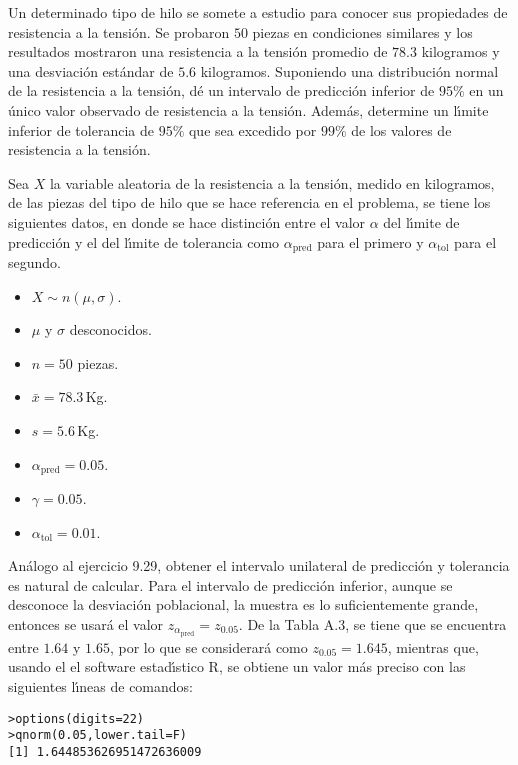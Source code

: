 \begin{enunciado}
 Un determinado tipo de hilo se somete a estudio para conocer sus propiedades de resistencia a la tensi\'on. Se probaron $50$ piezas en condiciones similares y los resultados mostraron una resistencia a la tensi\'on promedio de $78.3$ kilogramos y una desviaci\'on est\'andar de $5.6$ kilogramos. Suponiendo una distribuci\'on normal de la resistencia a la tensi\'on, d\'e un intervalo de predicci\'on inferior de $95\%$ en un \'unico valor observado de resistencia a la tensi\'on. Adem\'as, determine un l\'{\i}mite inferior de tolerancia de $95\%$ que sea excedido por $99\%$ de los valores de resistencia a la tensi\'on.
\end{enunciado}

\begin{solucion}
 Sea $X$ la variable aleatoria de la resistencia a la tensi\'on, medido en kilogramos, de las piezas del tipo de hilo que se hace referencia en el problema, se tiene los siguientes datos, en donde se hace distinci\'on entre el valor $\alpha$ del l\'{\i}mite de predicci\'on y el del l\'{\i}mite de tolerancia como $\alpha_{\text{pred}}$ para el primero y $\alpha_{\text{tol}}$ para el segundo.
 \begin{itemize}
  \item $X\sim n(\mu, \sigma)$.
  \item $\mu$ y $\sigma$ desconocidos.
  \item $n=50$ piezas.
  \item $\bar{x} = 78.3\,$Kg.
  \item $s=5.6\,$Kg.
  \item $\alpha_{\text{pred}} = 0.05$.
  \item $\gamma = 0.05$.
  \item $\alpha_{\text{tol}}=0.01$.
 \end{itemize}
 An\'alogo al ejercicio 9.29, obtener el intervalo unilateral de predicci\'on y tolerancia es natural de calcular. Para el intervalo de predicci\'on inferior, aunque se desconoce la desviaci\'on poblacional, la muestra es lo suficientemente grande, entonces se usar\'a el valor $z_{\alpha_{\text{pred}}} = z_{0.05}$. De la Tabla A.3, se tiene que se encuentra entre $1.64$ y $1.65$, por lo que se considerar\'a como $z_{0.05} = 1.645$, mientras que, usando el el software estad\'{\i}stico R, se obtiene un valor m\'as preciso con las siguientes l\'{\i}neas de comandos:
 \begin{verbatim}
>options(digits=22)
>qnorm(0.05,lower.tail=F)
[1] 1.644853626951472636009

\end{verbatim}
\end{solucion}
